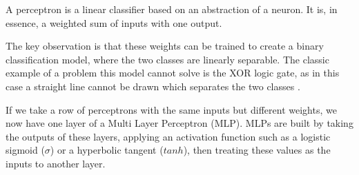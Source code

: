 \documentclass[bsc,singlespacing,logo, parskip, deptreport]{infthesis}
\begin{document}
A perceptron is a linear classifier based on an abstraction of a neuron. It is, in essence, a weighted sum of inputs with one output.

\begin{center}
\end{center}

The key observation is that these weights can be trained to create a binary classification model, where the two classes are linearly separable. The classic example of a problem this model cannot solve is the XOR logic gate, as in this case a straight line cannot be drawn which separates the two classes \cite{minsky1969perceptrons}.

If we take a row of perceptrons with the same inputs but different weights, we now have one layer of a Multi Layer Perceptron (MLP). MLPs are built by taking the outputs of these layers, applying an activation function such as a logistic sigmoid ($\sigma$) or a hyperbolic tangent ($tanh$), then treating these values as the inputs to another layer.

\begin{center}
\end{center}
\end{document}
